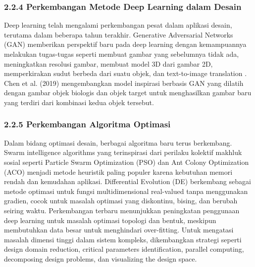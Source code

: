 \documentclass{article}
\begin{document}
\subsubsection*{2.2.4 Perkembangan Metode Deep Learning dalam Desain}
Deep learning telah mengalami perkembangan pesat dalam aplikasi desain, terutama dalam beberapa tahun terakhir. Generative Adversarial Networks (GAN) memberikan perspektif baru pada deep learning dengan kemampuannya melakukan tugas-tugas seperti membuat gambar yang sebelumnya tidak ada, meningkatkan resolusi gambar, membuat model 3D dari gambar 2D, memperkirakan sudut berbeda dari suatu objek, dan text-to-image translation \cite{jin2020new} \cite{rahman2020using}. Chen et al. (2019) \cite{chen2019artificial} mengembangkan model inspirasi berbasis GAN yang dilatih dengan gambar objek biologis dan objek target untuk menghasilkan gambar baru yang terdiri dari kombinasi kedua objek tersebut.

\subsubsection*{2.2.5 Perkembangan Algoritma Optimasi}
Dalam bidang optimasi desain, berbagai algoritma baru terus berkembang. Swarm intelligence algorithms yang terinspirasi dari perilaku kolektif makhluk sosial seperti Particle Swarm Optimization (PSO) dan Ant Colony Optimization (ACO) menjadi metode heuristik paling populer karena kebutuhan memori rendah dan kemudahan aplikasi. Differential Evolution (DE) berkembang sebagai metode optimasi untuk fungsi multidimensional real-valued tanpa menggunakan gradien, cocok untuk masalah optimasi yang diskontinu, bising, dan berubah seiring waktu. Perkembangan terbaru menunjukkan peningkatan penggunaan deep learning untuk masalah optimasi topologi dan bentuk, meskipun membutuhkan data besar untuk menghindari over-fitting. Untuk mengatasi masalah dimensi tinggi dalam sistem kompleks, dikembangkan strategi seperti design domain reduction, critical parameters identification, parallel computing, decomposing design problems, dan visualizing the design space.
\end{document}
